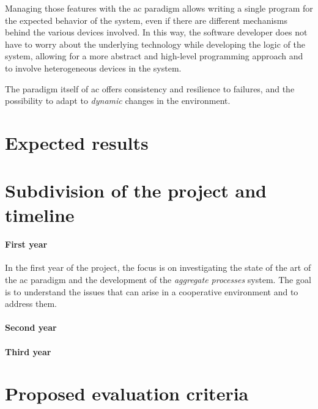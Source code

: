 \documentclass[12pt, a4paper]{article}
\begin{document}
Managing those features with the \ac{ac} paradigm allows writing a single program for the expected behavior of the system,
even if there are different mechanisms behind the various devices involved.
%
In this way,
the software developer does not have to worry about the underlying technology while developing the logic of the system,
allowing for a more abstract and high-level programming approach and to involve heterogeneous devices in the system.

The paradigm itself of \ac{ac} offers consistency and resilience to failures,
and the possibility to adapt to \emph{dynamic} changes in the environment.

\section{Expected results}\label{sec:expected-results}


\section{Subdivision of the project and timeline}\label{sec:subdivision-of-the-project-and-timeline}

\paragraph{First year}
In the first year of the project,
the focus is on investigating the state of the art of the \ac{ac} paradigm and the development of the \emph{aggregate processes} system.
%
The goal is to understand the issues that can arise in a cooperative environment and to address them.

\paragraph{Second year}

\paragraph{Third year}

\section{Proposed evaluation criteria}\label{sec:proposed-evaluation-criteria}



\end{document}
